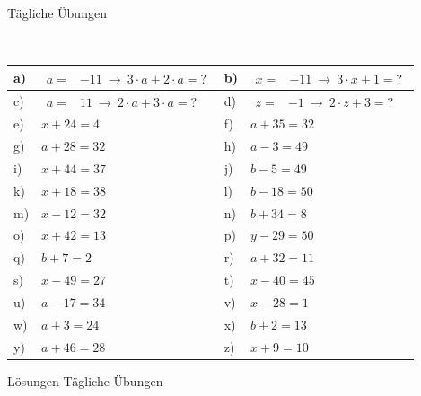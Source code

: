 \documentclass[12pt]{article}
\begin{document}
\centerline{{\Large Tägliche Übungen}} 
\vspace{1cm}
\noindent \\


\begin{xltabular}{\textwidth}{|C{0.75cm}|X|C{0.75cm}|X|}
\hline
a)&$\begin{aligned}
 a=&-11~ \rightarrow ~ 3 \cdot a + 2 \cdot a=?
\end{aligned}$
&
b)&$\begin{aligned}
 x=&-11~ \rightarrow ~ 3 \cdot x + 1=?
\end{aligned}$
\\\hline
c)&$\begin{aligned}
 a=&11~ \rightarrow ~ 2 \cdot a + 3 \cdot a=?
\end{aligned}$
&
d)&$\begin{aligned}
 z=&-1~ \rightarrow ~ 2 \cdot z + 3=?
\end{aligned}$
\\\hline
e)&$x+24 = 4$
&
f)&$a+35 = 32$
\\\hline
g)&$a+28 = 32$
&
h)&$a-3 = 49$
\\\hline
i)&$x+44 = 37$
&
j)&$b-5 = 49$
\\\hline
k)&$x+18 = 38$
&
l)&$b-18 = 50$
\\\hline
m)&$x-12 = 32$
&
n)&$b+34 = 8$
\\\hline
o)&$x+42 = 13$
&
p)&$y-29 = 50$
\\\hline
q)&$b+7 = 2$
&
r)&$a+32 = 11$
\\\hline
s)&$x-49 = 27$
&
t)&$x-40 = 45$
\\\hline
u)&$a-17 = 34$
&
v)&$x-28 = 1$
\\\hline
w)&$a+3 = 24$
&
x)&$b+2 = 13$
\\\hline
y)&$a+46 = 28$
&
z)&$x+9 = 10$
\\\hline
\end{xltabular}
\vspace{0.5cm}
\newpage
{}
\centerline{{\large Lösungen Tägliche Übungen}} 
\vspace{0.5cm}
\end{document}
